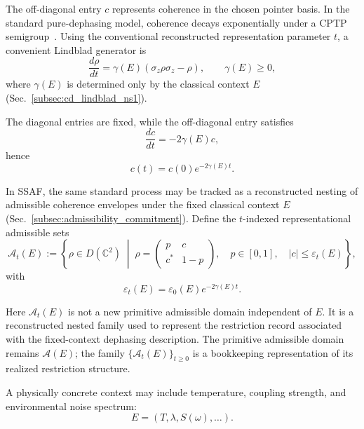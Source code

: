 \documentclass[aps,prx,onecolumn,11pt]{revtex4-2}
\theoremstyle{plain}
\theoremstyle{definition}
\theoremstyle{remark}
\begin{document}
The off-diagonal entry \(c\) represents coherence in the chosen pointer
basis. In the standard pure-dephasing model, coherence decays
exponentially under a CPTP semigroup~\cite{Lindblad1976,Gorini1976}.
Using the conventional reconstructed representation parameter \(t\), a
convenient Lindblad generator is
\begin{equation}
\frac{d\rho}{dt}
=
\gamma(E)
\left(
\sigma_z\rho\sigma_z-\rho
\right),
\qquad
\gamma(E)\geq 0,
\label{eq:wk_pure_dephasing_generator}
\end{equation}
where \(\gamma(E)\) is determined only by the classical context \(E\)
(Sec.~\ref{subsec:cd_lindblad_ns1}).

The diagonal entries are fixed, while the off-diagonal entry satisfies
\begin{equation}
\frac{dc}{dt}
=
-2\gamma(E)c,
\label{eq:wk_coherence_decay_ode}
\end{equation}
hence
\begin{equation}
c(t)
=
c(0)e^{-2\gamma(E)t}.
\label{eq:wk_coherence_exponential_decay}
\end{equation}

In SSAF, the same standard process may be tracked as a reconstructed
nesting of admissible coherence envelopes under the fixed classical
context \(E\)
(Sec.~\ref{subsec:admissibility_commitment}). Define the
\(t\)-indexed representational admissible sets
\begin{equation}
\mathcal A_t(E)
:=
\left\{
\rho\in D(\mathbb C^2)
\;\middle|\;
\rho=
\begin{pmatrix}
p & c\\
c^* & 1-p
\end{pmatrix},
\quad
p\in[0,1],
\quad
|c|\leq\varepsilon_t(E)
\right\},
\label{eq:wk_time_indexed_admissible_set}
\end{equation}
with
\begin{equation}
\varepsilon_t(E)
=
\varepsilon_0(E)e^{-2\gamma(E)t}.
\label{eq:wk_admissibility_envelope_contraction}
\end{equation}

Here \(\mathcal A_t(E)\) is not a new primitive admissible domain
independent of \(E\). It is a reconstructed nested family used to
represent the restriction record associated with the fixed-context
dephasing description. The primitive admissible domain remains
\(\mathcal A(E)\); the family \(\{\mathcal A_t(E)\}_{t\geq0}\) is a
bookkeeping representation of its realized restriction structure.

A physically concrete context may include temperature, coupling
strength, and environmental noise spectrum:
\begin{equation}
E
=
(T,\lambda,S(\omega),\ldots).
\label{eq:wk_environment_context_components}
\end{equation}
\end{document}
